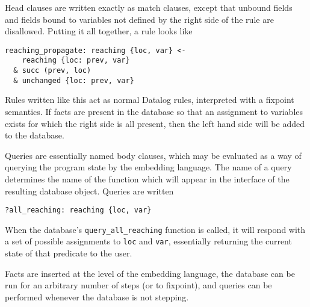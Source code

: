 Head clauses are written exactly as match clauses, except that unbound fields and fields bound to variables not defined by the right side of the rule are disallowed.
Putting it all together, a rule looks like
\begin{verbatim}
reaching_propagate: reaching {loc, var} <-
    reaching {loc: prev, var}
  & succ (prev, loc)
  & unchanged {loc: prev, var}
\end{verbatim}
Rules written like this act as normal Datalog rules, interpreted with a fixpoint semantics.
If facts are present in the database so that an assignment to variables exists for which the right side is all present, then the left hand side will be added to the database.

Queries are essentially named body clauses, which may be evaluated as a way of querying the program state by the embedding language.
The name of a query determines the name of the function which will appear in the interface of the resulting database object.
Queries are written
\begin{verbatim}
?all_reaching: reaching {loc, var}
\end{verbatim}
When the database's \texttt{query\_all\_reaching} function is called, it will respond with a set of possible assignments to \texttt{loc} and \texttt{var}, essentially returning the current state of that predicate to the user.

Facts are inserted at the level of the embedding language, the database can be run for an arbitrary number of steps (or to fixpoint), and queries can be performed whenever the database is not stepping.


